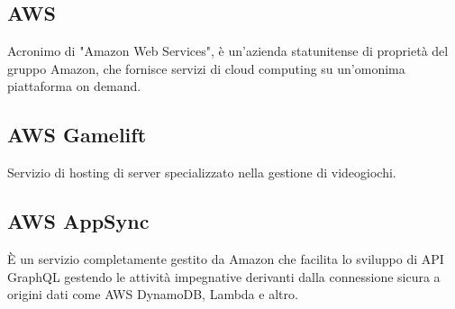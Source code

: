 	\subsection{AWS}
		Acronimo di "Amazon Web Services", è un'azienda statunitense di proprietà del gruppo Amazon, che fornisce servizi di cloud computing su un'omonima piattaforma on demand.
	\subsection{AWS Gamelift}
        		Servizio di hosting di server specializzato nella gestione di videogiochi.
	\subsection{AWS AppSync}
	    È un servizio completamente gestito da Amazon che facilita lo sviluppo di API GraphQL gestendo le attività impegnative derivanti dalla connessione sicura a origini dati come AWS DynamoDB, Lambda e altro.
\newpage
